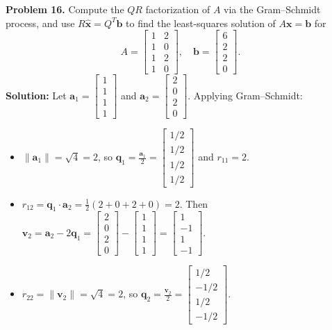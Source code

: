 \documentclass[11pt, letterpaper]{article}
\theoremstyle{definition}
\theoremstyle{remark}
\begin{document}
\textbf{Problem 16.} Compute the $QR$ factorization of $A$ via the Gram--Schmidt process, and use $R\hat{\mathbf{x}} = Q^T \mathbf{b}$ to find the least-squares solution of $A\mathbf{x} = \mathbf{b}$ for
\[
A = \begin{bmatrix} 1 & 2 \\ 1 & 0 \\ 1 & 2 \\ 1 & 0 \end{bmatrix}, \quad \mathbf{b} = \begin{bmatrix} 6 \\ 2 \\ 2 \\ 0 \end{bmatrix}.
\]
\textbf{Solution:} Let $\mathbf{a}_1 = \begin{bmatrix} 1 \\ 1 \\ 1 \\ 1 \end{bmatrix}$ and $\mathbf{a}_2 = \begin{bmatrix} 2 \\ 0 \\ 2 \\ 0 \end{bmatrix}$. Applying Gram--Schmidt:
\begin{itemize}
    \item $\|\mathbf{a}_1\| = \sqrt{4} = 2$, so $\mathbf{q}_1 = \frac{\mathbf{a}_1}{2} = \begin{bmatrix} 1/2 \\ 1/2 \\ 1/2 \\ 1/2 \end{bmatrix}$ and $r_{11} = 2$.
    \item $r_{12} = \mathbf{q}_1 \cdot \mathbf{a}_2 = \frac{1}{2}(2 + 0 + 2 + 0) = 2$. Then $\mathbf{v}_2 = \mathbf{a}_2 - 2\mathbf{q}_1 = \begin{bmatrix} 2 \\ 0 \\ 2 \\ 0 \end{bmatrix} - \begin{bmatrix} 1 \\ 1 \\ 1 \\ 1 \end{bmatrix} = \begin{bmatrix} 1 \\ -1 \\ 1 \\ -1 \end{bmatrix}$.
    \item $r_{22} = \|\mathbf{v}_2\| = \sqrt{4} = 2$, so $\mathbf{q}_2 = \frac{\mathbf{v}_2}{2} = \begin{bmatrix} 1/2 \\ -1/2 \\ 1/2 \\ -1/2 \end{bmatrix}$.
\end{itemize}
\end{document}
